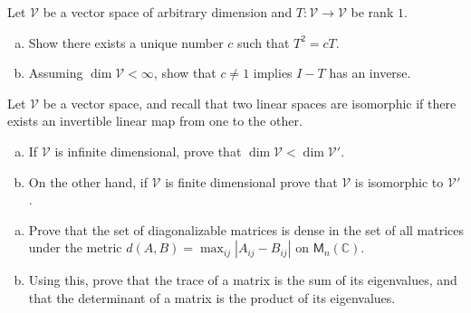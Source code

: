 \documentclass[12pt,letterpaper,cm]{hmcpset}
\begin{document}
\begin{problem}[1 (Lax 3.14)]
    Let $\mathcal{V}$ be a vector space of arbitrary dimension and $T : \mathcal{V}\to\mathcal{V}$
    be rank $1$.
\begin{enumerate}[(a)]
    \item Show there exists a unique number $c$ such that $T^2 = cT$.
    \item Assuming $\dim\mathcal{V}<\infty$, show that $c\neq 1$ implies $I-T$ has an inverse.
\end{enumerate}
\end{problem}

\begin{solution}
    \vfill
\end{solution}
\clearpage

\begin{problem}[2]
    Let $\mathcal{V}$ be a vector space, and recall that two linear spaces are
    isomorphic if there exists an invertible linear map from one to the other.
\begin{enumerate}[(a)]
    \item If $\mathcal{V}$ is infinite dimensional, prove that $\dim\mathcal{V} < \dim\mathcal{V}'$.
    \item On the other hand, if $\mathcal{V}$ is finite dimensional prove that
        $\mathcal{V}$ is isomorphic to $\mathcal{V}'$.
\end{enumerate}
\end{problem}

\begin{solution}
    \vfill
\end{solution}
\clearpage

\begin{problem}[3]
\begin{enumerate}[(a)]
    \item Prove that the set of diagonalizable matrices is dense in the set of all matrices
        under the metric $d(A,B) = \max_{ij}|A_{ij} - B_{ij}|$ on $\mathsf{M}_n(\mathbb{C})$.
    \item Using this, prove that the trace of a matrix is the sum of its eigenvalues, and that the determinant
        of a matrix is the product of its eigenvalues.
\end{enumerate}
\end{problem}

\begin{solution}
    \vfill
\end{solution}
\clearpage
\end{document}
